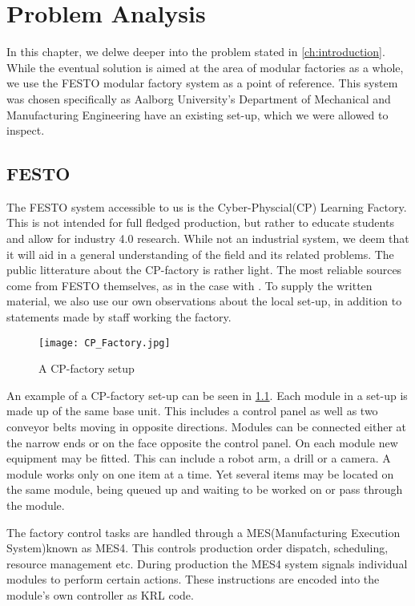 \chapter{Problem Analysis}\label{ch:problemanalysis}
In this chapter, we delwe deeper into the problem stated in \cref{ch:introduction}. While the eventual solution is aimed at the area of modular factories as a whole, we use the FESTO modular factory system \cite{FESTOweb} as a point of reference. This system was chosen specifically as Aalborg University's Department of Mechanical and Manufacturing Engineering have an existing set-up, which we were allowed to inspect. 

\section{FESTO}\label{sec:festo}
The FESTO system accessible to us is the Cyber-Physcial(CP) Learning Factory. This is not intended for full fledged production, but rather to educate students and allow for industry 4.0 research. While not an industrial system, we deem that it will aid in a general understanding of the field and its related problems. The public litterature about the CP-factory is rather light. The most reliable sources come from FESTO themselves, as in the case with \cite{CPFactory2015}. To supply the written material, we also use our own observations about the local set-up, in addition to statements made by staff working the factory.  

\begin{figure}[h]
\centering
\texttt{[image: CP\_Factory.jpg]}
\caption{A CP-factory setup}
\label{fig:festo-example}
\end{figure}

An example of a CP-factory set-up can be seen in \cref{fig:festo-example}. Each module in a set-up is made up of the same base unit. This includes a control panel as well as two conveyor belts moving in opposite directions. Modules can be connected either at the narrow ends or on the face opposite the control panel. On each module new equipment may be fitted. This can include a robot arm, a drill or a camera. A module works only on one item at a time. Yet several items may be located on the same module, being queued up and waiting to be worked on or pass through the module.

The factory control tasks are handled through a MES(Manufacturing Execution System)known as MES4. This controls production order dispatch, scheduling, resource management etc. During production the MES4 system signals individual modules to perform certain actions. These instructions are encoded into the module's own controller as KRL code.

